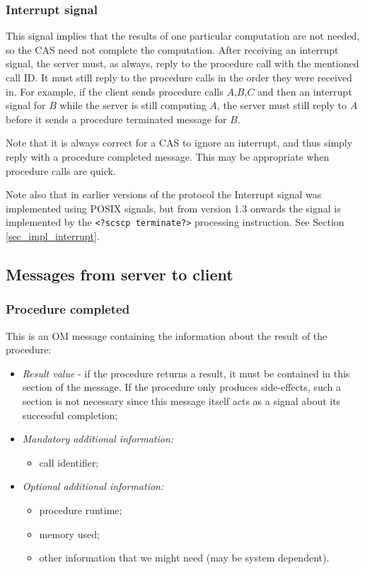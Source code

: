 \documentclass{amsart}
\begin{document}
\subsubsection{Interrupt signal}
This signal implies that the results of one particular computation are not needed, so the CAS need not complete the computation. After receiving an interrupt signal, the server must, as always, reply to the procedure call with the mentioned call ID. It must still reply to the procedure calls in the order they were received in. For example, if the client sends procedure calls $A$,$B$,$C$ and then an interrupt signal for $B$ while the server is still computing $A$, the server must still reply to $A$ before it sends a procedure terminated message for $B$.

Note that it is always correct for a CAS to ignore an interrupt, and thus simply reply with a procedure completed message. This may be appropriate when procedure calls are quick.

Note also that in earlier versions of the protocol the Interrupt signal was implemented using POSIX signals, but from version 1.3 onwards the signal is implemented by the {\tt <?scscp terminate?>} processing instruction. See Section \ref{sec_impl_interrupt}.

\subsection{Messages from server to client}

\subsubsection{Procedure completed}

This is an OM message containing the information about the result of the procedure:
\begin{itemize}
\item {\it Result value} - if the procedure returns a result, it must be contained in 
this section of the message. 
If the procedure only produces side-effects, such a section is not necessary since
this message itself acts as a signal about its successful completion;
\item {\it Mandatory additional information:}
\begin{itemize}
\item call identifier;
\end{itemize}
\item {\it Optional additional information:}
\begin{itemize}
\item procedure runtime;
\item memory used;
\item other information that we might need (may be system dependent).
\end{itemize}
\end{itemize}
\end{document}
